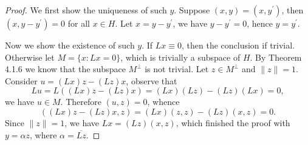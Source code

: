 \begin{proof}
We first show the uniqueness of such $y$. Suppose $(x,y)=(x,y^\prime)$, then $(x,y-y^\prime)=0$ for all $x\in H$. Let $x=y-y^\prime$, we have $y-y^\prime=0$, hence $y=y^\prime$.\par
Now we show the existence of such $y$. If $Lx\equiv 0$, then the conclusion if trivial. Otherwise let $M=\{x:Lx=0\}$, which is trivially a subspace of $H$. By Theorem 4.1.6 we know that the subspace $M^\perp$ is not trivial. Let $z\in M^\perp$ and $\|z\|=1$. Consider $u=(Lx)z-(Lz)x$, observe that 
$$
Lu=L\left( \left( Lx \right) z-\left( Lz \right) x \right) =\left( Lx \right) \left( Lz \right) -\left( Lz \right) \left( Lx \right) =0,
$$
we have $u\in M$. Therefore $(u,z)=0$, whence 
$$
\left( \left( Lx \right) z-\left( Lz \right) x,z \right) =\left( Lx \right) \left( z,z \right) -\left( Lz \right) \left( x,z \right) =0.
$$
Since $\|z\|=1$, we have $Lx=\left( Lz \right) \left( x,z \right)$, which finished the proof with $y=\alpha z$, where $\alpha=\overline{Lz}$.
\end{proof}
